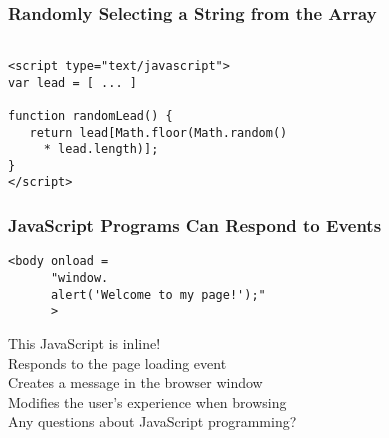 \documentclass[14pt,aspectratio=169]{beamer}
\begin{document}
%
\begin{frame}[fragile]
  \frametitle{Randomly Selecting a String from the Array}
  \normalsize
  \begin{minipage}{6in}
    \vspace*{.2in}
    \begin{verbatim}

<script type="text/javascript">
var lead = [ ... ]

function randomLead() {
   return lead[Math.floor(Math.random()
     * lead.length)];
}
</script>

    \end{verbatim}
  \end{minipage}
\end{frame}

%
\begin{frame}[fragile]
  \frametitle{JavaScript Programs Can Respond to Events}
  \normalsize
  \begin{minipage}{6in}
    \vspace*{.2in}
    \begin{verbatim}
<body onload =
      "window.
      alert('Welcome to my page!');"
      >
    \end{verbatim}
  \end{minipage}
  \vspace*{.1in}
  \begin{center}
    This JavaScript is inline! \\
    Responds to the page loading event \\
    Creates a message in the browser window \\
    Modifies the user's experience when browsing \\
    Any questions about JavaScript programming? \\
  \end{center}
\end{frame}
\end{document}
